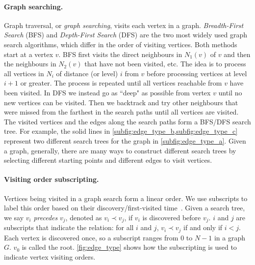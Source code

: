 \paragraph{Graph searching.} 
Graph traversal, or \emph{graph searching}, visits each vertex in a graph. \emph{Breadth-First Search} (BFS) and \emph{Depth-First Search} (DFS) are the two most widely used graph search algorithms, which differ in the order of visiting vertices. Both methods start at a vertex $v$. BFS first visits the direct neighbours in $N_1(v)$ of $v$ and then the neighbours in $N_2(v)$ that have not been visited, etc. The idea is to process all vertices in $N_i$ of distance (or level) $i$ from $v$ before processing vertices at level $i+1$ or greater. The process is repeated until all vertices reachable from $v$ have been visited. In DFS we instead go as ``deep" as possible from vertex $v$ until no new vertices can be visited. Then we backtrack and try other neighbours that were missed from the farthest in the search paths until all vertices are visited. The visited vertices and the edges along the search paths form a BFS/DFS search tree. For example, the solid lines in \cref{subfig:edge_type_b,subfig:edge_type_c} represent two different search trees for the graph in \cref{subfig:edge_type_a}. Given a graph, generally, there are many ways to construct different search trees by selecting different starting points and different edges to visit vertices.

\paragraph{Visiting order subscripting.} Vertices being visited in a graph search form a linear order. We use subscripts to label this order based on their discovery/first-visited time~\citep{Cormen_algointro}. Given a search tree, we say $v_i$ \emph{precedes} $v_j$, denoted as $v_i\prec v_j$, if $v_i$ is discovered before $v_j$. $i$ and $j$ are subscripts that indicate the relation: for all $i$ and $j$, $v_i\prec v_j$ if and only if $i< j$. Each vertex is discovered once, so a subscript ranges from 0 to $N-1$ in a graph $G$. $v_0$ is called the root. \cref{fig:edge_type} shows how the subscripting is used to indicate vertex visiting orders. 


